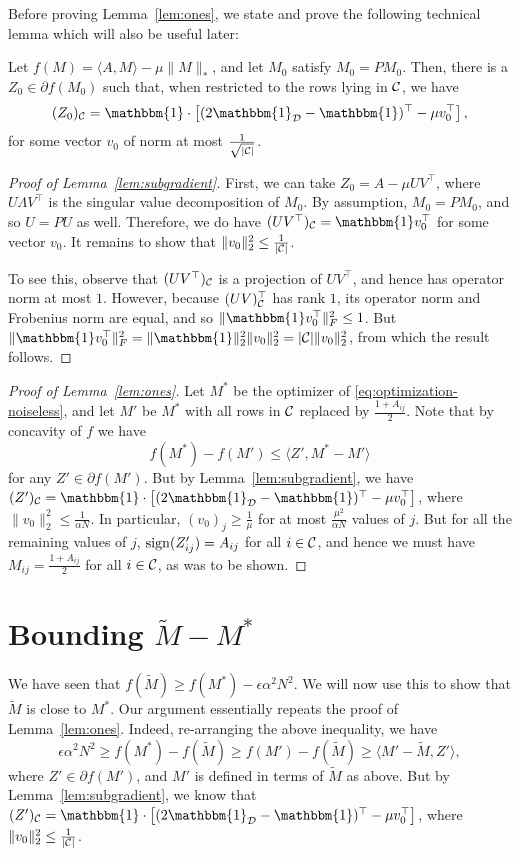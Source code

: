 \documentclass[11pt]{article}
\newcommand{\M}{\tilde{M}}
\newcommand{\sD}{\mathcal{D}}
\newcommand{\bi}{\mathbbm{1}}
\begin{document}
Before proving Lemma~\ref{lem:ones}, we state and prove the 
following technical lemma which will also be useful later:
\begin{lemma}
\label{lem:subgradient}
Let $f(M) = \langle A, M \rangle - \mu \|M\|_*$, and let 
$M_0$ satisfy $M_0 = PM_0$. Then,
there is a $Z_0 \in \partial f(M_0)$ such that, when restricted 
to the rows lying in $\mathcal{C}$, we have
\[ (Z_0)_{\sC} = \bi \cdot \left[(2\bi_{\sD}-\bi)^{\top} - \mu v_0^{\top}\right], \]
for some vector $v_0$ of norm at most $\frac{1}{\sqrt{|\mathcal{C}|}}$.
\end{lemma}
\begin{proof}[Proof of Lemma~\ref{lem:subgradient}]
First, we can take $Z_0 = A - \mu UV^{\top}$, where $U \Lambda V^{\top}$ is the singular 
value decomposition of $M_0$. By assumption, $M_0 = PM_0$, and so $U = PU$ as well. Therefore, 
we do have $(UV^{\top})_{\sC} = \bi v_0^{\top}$ for some vector $v_0$. It remains to show that 
$\|v_0\|_2^2 \leq \frac{1}{|\mathcal{C}|}$.

To see this, observe that $(UV^{\top})_{\mathcal{C}}$ is a projection of $UV^{\top}$, and hence 
has operator norm at most $1$. However, because $(UV)^{\top}_{\mathcal{C}}$ has rank $1$, its 
operator norm and Frobenius norm are equal, and so $\|\bi v_0^{\top}\|_F^2 \leq 1$. 
But $\|\bi v_0^{\top}\|_F^2 = \|\bi\|_2^2\|v_0\|_2^2 = |\sC|\|v_0\|_2^2$, from which 
the result follows.
\end{proof}

\begin{proof}[Proof of Lemma~\ref{lem:ones}]
Let $M^*$ be the optimizer of \eqref{eq:optimization-noiseless}, and 
let $M'$ be $M^*$ with all rows in $\mathcal{C}$ replaced by $\frac{1+A_{ij}}{2}$.
Note that by concavity of $f$ we have
\[ f(M^*) - f(M') \leq \langle Z', M^* - M' \rangle \]
for any $Z' \in \partial f(M')$. But by Lemma~\ref{lem:subgradient}, we 
have $(Z')_{\sC} = \bi \cdot \left[(2\bi_{\sD}-\bi)^{\top} - \mu v_0^{\top}\right]$, 
where $\|v_0\|_2^2 \leq \frac{1}{\alpha N}$. In particular, $(v_0)_j \geq \frac{1}{\mu}$ 
for at most $\frac{\mu^2}{\alpha N}$ values of $j$. But for all the remaining values of $j$, 
$\operatorname{sign}(Z'_{ij}) = A_{ij}$ for all $i \in \mathcal{C}$, and hence we must have $M_{ij} = \frac{1 + A_{ij}}{2}$ 
for all $i \in \mathcal{C}$, as was to be shown.
\end{proof}

\section{Bounding $\M - M^*$}

We have seen that $f(\M) \geq f(M^*) - \epsilon \alpha^2 N^2$. We will now 
use this to show that $\M$ is close to $M^*$. Our argument essentially repeats 
the proof of Lemma~\ref{lem:ones}. Indeed, re-arranging the above 
inequality, we have
\[ \epsilon \alpha^2 N^2 \geq f(M^*) - f(\M) \geq f(M') - f(\M) \geq \langle M' - \M, Z' \rangle, \]
where $Z' \in \partial f(M')$, and $M'$ is defined in terms of $\M$ as above. 
But by Lemma~\ref{lem:subgradient}, we know that $(Z')_{\sC} = \bi \cdot \left[(2\bi_{\sD}-\bi)^{\top} - \mu v_0^{\top}\right]$, 
where $\|v_0\|_2^2 \leq \frac{1}{|\mathcal{C}|}$. 
\end{document}

